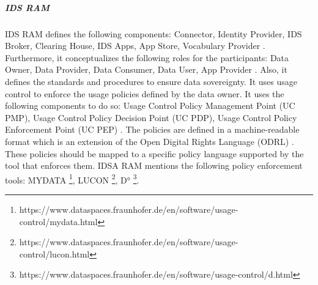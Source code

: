 \documentclass{article}
\begin{document}
\subparagraph{IDS RAM}
IDS RAM defines the following components:
Connector, Identity Provider, IDS Broker, Clearing House, IDS Apps, App Store, Vocabulary Provider \cite{pettenpohl_international_2022}.
Furthermore, it conceptualizes the following roles for the participants:
Data Owner, Data Provider, Data Consumer, Data User, App Provider
\cite{pettenpohl_international_2022}.
Also, it defines the standards and procedures to ensure data sovereignty. It uses usage control to enforce the usage policies defined by the data owner. It uses the following components to do so: Usage Control Policy Management Point (UC PMP), Usage Control Policy Decision Point (UC PDP), Usage Control Policy Enforcement Point (UC PEP) \cite{otto_evolution_2022}.
The policies are defined in a machine-readable format which is an extension of the Open Digital Rights Language (ODRL) \cite{eitel_usage_2021}. These policies should be mapped to a specific policy language supported by the tool that enforces them. IDSA RAM mentions the following policy enforcement tools: MYDATA \footnote{https://www.dataspaces.fraunhofer.de/en/software/usage-control/mydata.html}, LUCON \footnote{https://www.dataspaces.fraunhofer.de/en/software/usage-control/lucon.html}, D° \footnote{https://www.dataspaces.fraunhofer.de/en/software/usage-control/d.html}. 
\end{document}
